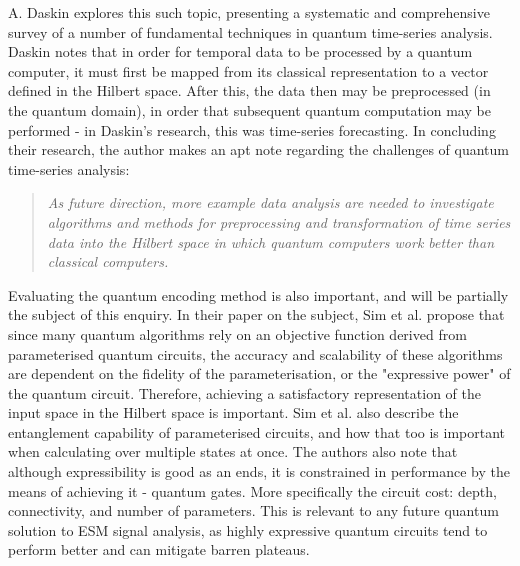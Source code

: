 A. Daskin \cite{daskin_walk_2022} explores this such topic, presenting a systematic and comprehensive survey of a number of fundamental techniques in quantum time-series analysis.
Daskin notes that in order for temporal data to be processed by a quantum computer, it must first be mapped from its classical representation to a vector defined in the Hilbert space.
After this, the data then may be preprocessed (in the quantum domain), in order that subsequent quantum computation may be performed - in Daskin's research, this was time-series forecasting.
In concluding their research, the author makes an apt note regarding the challenges of quantum time-series analysis:
\begin{quote}
    \textit{As future direction, more example data analysis are needed to investigate algorithms and methods for preprocessing and transformation of time series data into the Hilbert space in which quantum computers work better than classical computers.} \cite{daskin_walk_2022}
\end{quote}

Evaluating the quantum encoding method is also important, and will be partially the subject of this enquiry.
In their paper on the subject, Sim et al.\cite{sim_expressibility_2019} propose that since many quantum algorithms rely on an objective function derived from parameterised quantum circuits, the accuracy and scalability of these algorithms are dependent on the fidelity of the parameterisation, or the "expressive power" of the quantum circuit.
Therefore, achieving a satisfactory representation of the input space in the Hilbert space is important.
Sim et al. also describe the entanglement capability of parameterised circuits, and how that too is important when calculating over multiple states at once.
The authors also note that although expressibility is good as an ends, it is constrained in performance by the means of achieving it - quantum gates.
More specifically the circuit cost: depth, connectivity, and number of parameters.
This is relevant to any future quantum solution to \ac{ESM} signal analysis, as highly expressive quantum circuits tend to perform better and can mitigate barren plateaus.

